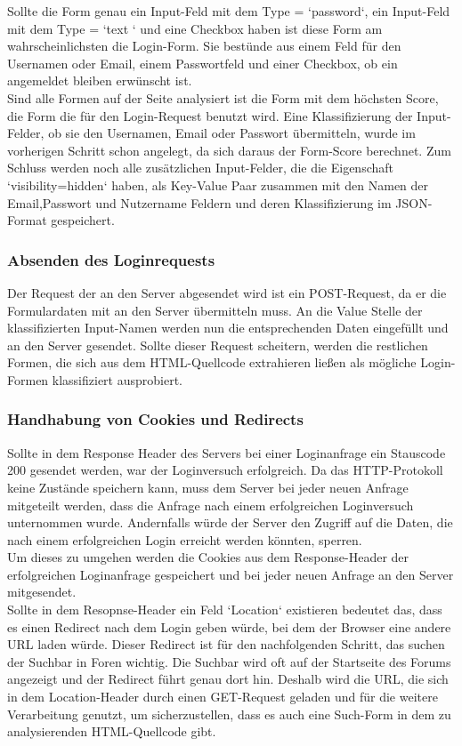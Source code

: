  
Sollte die Form genau ein Input-Feld mit dem Type = `password`, ein Input-Feld mit dem Type = `text ` und eine Checkbox haben ist diese Form am wahrscheinlichsten die Login-Form. Sie bestünde aus einem Feld für den Usernamen oder Email, einem Passwortfeld und einer Checkbox, ob ein angemeldet bleiben erwünscht ist.\\
Sind alle Formen auf der Seite analysiert ist die Form mit dem höchsten Score, die Form die für den Login-Request benutzt wird. Eine Klassifizierung der Input-Felder, ob sie den Usernamen, Email oder Passwort übermitteln, wurde im vorherigen Schritt schon angelegt, da sich daraus der Form-Score berechnet. Zum Schluss werden noch alle zusätzlichen Input-Felder, die die Eigenschaft `visibility=hidden` haben, als Key-Value Paar zusammen mit den Namen der Email,Passwort und Nutzername Feldern und deren Klassifizierung im JSON-Format gespeichert.
\subsubsection{Absenden des Loginrequests}
Der Request der an den Server abgesendet wird ist ein POST-Request, da er die Formulardaten mit an den Server übermitteln muss.
An die Value Stelle der klassifizierten Input-Namen werden nun die entsprechenden Daten eingefüllt und an den Server gesendet.
Sollte dieser Request scheitern, werden die restlichen Formen, die sich aus dem HTML-Quellcode extrahieren ließen als mögliche Login-Formen klassifiziert ausprobiert.
\subsubsection{Handhabung von Cookies und Redirects}
Sollte in dem Response Header des Servers bei einer Loginanfrage ein Stauscode 200 gesendet werden, war der Loginversuch erfolgreich. Da das HTTP-Protokoll keine Zustände speichern kann, muss dem Server bei jeder neuen Anfrage mitgeteilt werden, dass die Anfrage nach einem erfolgreichen Loginversuch unternommen wurde. Andernfalls würde der Server den Zugriff auf die Daten, die nach einem erfolgreichen Login erreicht werden könnten, sperren.\\
Um dieses zu umgehen werden die Cookies aus dem Response-Header der erfolgreichen Loginanfrage gespeichert und bei jeder neuen Anfrage an den Server mitgesendet.\\
Sollte in dem Resopnse-Header ein Feld `Location` existieren bedeutet das, dass es einen Redirect nach dem Login geben würde, bei dem der Browser eine andere URL laden würde. Dieser Redirect ist für den nachfolgenden Schritt, das suchen der Suchbar in Foren wichtig. Die Suchbar wird oft auf der Startseite des Forums angezeigt und der Redirect führt genau dort hin. Deshalb wird die URL, die sich in dem Location-Header durch einen GET-Request geladen und für die weitere Verarbeitung genutzt, um sicherzustellen, dass es auch eine Such-Form in dem zu analysierenden HTML-Quellcode gibt.

